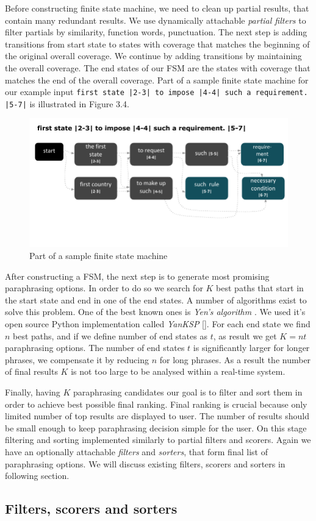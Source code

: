 Before constructing finite state machine, we need to clean up partial results, that contain many redundant results. We use dynamically attachable \emph{partial filters} to filter partials by similarity, function words, punctuation. The next step is adding transitions from start state to states with coverage that matches the beginning of the original overall coverage. We continue by adding transitions by maintaining the overall coverage. The end states of our FSM are the states with coverage that matches the end of the overall coverage. Part of a sample finite state machine for our example input \texttt{first state |2-3| to impose |4-4| such a requirement. |5-7|} is illustrated in Figure 3.4.

\begin{figure}
 \centering 
 \includegraphics{g/fsm.pdf}
 \caption{Part of a sample finite state machine}
\end{figure}

After constructing a FSM, the next step is to generate most promising paraphrasing options. In order to do so we search for $K$ best paths that start in the start state and end in one of the end states. A number of algorithms exist to solve this problem. One of the best known ones is \emph{Yen's algorithm} \cite{yen1971finding}. We used it's open source Python implementation called \emph{YanKSP} []. For each end state we find $n$ best paths, and if we define number of end states as $t$, as result we get $K = nt$ paraphrasing options. The number of end states $t$ is significantly larger for longer phrases, we compensate it by reducing $n$ for long phrases. As a result the number of final results $K$ is not too large to be analysed within a real-time system.

Finally, having $K$ paraphrasing candidates our goal is to filter and sort them in order to achieve best possible final ranking. Final ranking is crucial because only limited number of top results are displayed to user. The number of results should be small enough to keep paraphrasing decision simple for the user. On this stage filtering and sorting implemented similarly to partial filters and scorers. Again we have an optionally attachable \emph{filters} and \emph{sorters}, that form final list of paraphrasing options. We will discuss existing filters, scorers and sorters in following section.

\subsection{Filters, scorers and sorters}



